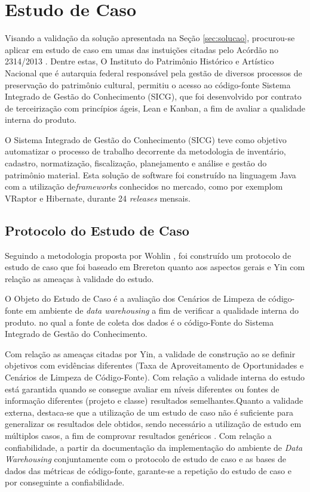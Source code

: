 \section {Estudo de Caso}

Visando a validação da solução apresentada na Seção \ref{sec:solucao}, procurou-se aplicar em estudo de caso em umas das instuições citadas pelo Acórdão no 2314/2013 \cite{TCU:2013}. Dentre estas, O Instituto do Patrimônio Histórico e Artístico Nacional que é autarquia federal responsável pela gestão de diversos processos de preservação do patrimônio cultural, permitiu o acesso ao código-fonte Sistema Integrado de Gestão do Conhecimento (SICG), que foi desenvolvido por contrato de terceirização com princípios ágeis, Lean e Kanban, a fim de avaliar a qualidade interna do produto. 

O Sistema Integrado de Gestão do Conhecimento (SICG) teve como objetivo automatizar o processo de trabalho decorrente da metodologia de inventário, cadastro, normatização, fiscalização, planejamento e análise e gestão do patrimônio material. Esta solução de software foi construído na linguagem Java com a utilização de\textit{frameworks} conhecidos no mercado, como por exemplom VRaptor e Hibernate, durante 24 \textit{releases} mensais.

\subsection{Protocolo do Estudo de Caso}
Seguindo a metodologia proposta por Wohlin \cite{wohlin2012experimentation}, foi construído um protocolo de estudo de caso que foi baseado em Brereton \cite{brereton2008using} quanto aos aspectos gerais e Yin \cite{yin2011applications} com relação as ameaças à validade do estudo. 

O Objeto do Estudo de Caso é a avaliação dos Cenários de Limpeza de código-fonte em ambiente de \textit{data warehousing} a fim de verificar a qualidade interna do produto. no qual a fonte de coleta dos dados é o código-Fonte do Sistema Integrado de Gestão do Conhecimento.

Com relação as ameaças citadas por Yin, a validade de construção ao se definir objetivos com evidências diferentes (Taxa de Aproveitamento de Oportunidades e Cenários de Limpeza de Código-Fonte). Com relação a validade interna do estudo está garantida quando se consegue avaliar em níveis diferentes ou fontes de informação diferentes (projeto e classe) resultados semelhantes.Quanto a validade externa, destaca-se que a utilização de um estudo de caso não é suficiente para generalizar os resultados dele obtidos, sendo necessário a utilização de estudo em múltiplos casos, a fim de comprovar resultados genéricos \cite{yin2011applications}. Com relação a confiabilidade, a partir da documentação da implementação do ambiente de \textit{Data Warehousing} conjuntamente com o protocolo de estudo de caso e as bases de dados das métricas de código-fonte, garante-se a repetição do estudo de caso e por conseguinte a confiabilidade.




